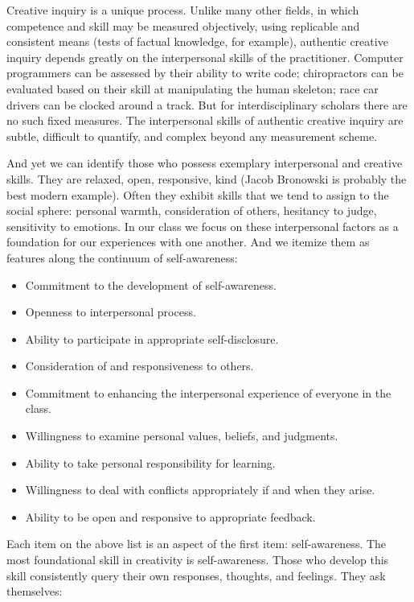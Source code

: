 \documentclass[letterpaper,10pt,headsepline]{scrreprt}
\begin{document}
Creative inquiry is a unique process. Unlike many other fields, in which competence and skill may be measured objectively, using replicable and consistent means (tests of factual knowledge, for example), authentic creative inquiry depends greatly on the interpersonal skills of the practitioner. Computer programmers can be assessed by their ability to write code; chiropractors can be evaluated based on their skill at manipulating the human skeleton; race car drivers can be clocked around a track. But for interdisciplinary scholars there are no such fixed measures. The interpersonal skills of authentic creative inquiry are subtle, difficult to quantify, and complex beyond any measurement scheme.

And yet we can identify those who possess exemplary interpersonal and creative skills. They are relaxed, open, responsive, kind (Jacob Bronowski is probably the best modern example). Often they exhibit skills that we tend to assign to the social sphere: personal warmth, consideration of others, hesitancy to judge, sensitivity to emotions. In our class we focus on these interpersonal factors as a foundation for our experiences with one another. And we itemize them as features along the continuum of self-awareness:

\begin{itemize}
\item Commitment to the development of self-awareness.
\item Openness to interpersonal process.
\item Ability to participate in appropriate self-disclosure.
\item Consideration of and responsiveness to others.
\item Commitment to enhancing the interpersonal experience of everyone in the class.
\item Willingness to examine personal values, beliefs, and judgments.
\item Ability to take personal responsibility for learning.
\item Willingness to deal with conflicts appropriately if and when they arise.
\item Ability to be open and responsive to appropriate feedback.
\end{itemize}

Each item on the above list is an aspect of the first item: self-awareness. The most foundational skill in creativity is self-awareness. Those who develop this skill consistently query their own responses, thoughts, and feelings. They ask themselves:
\end{document}
